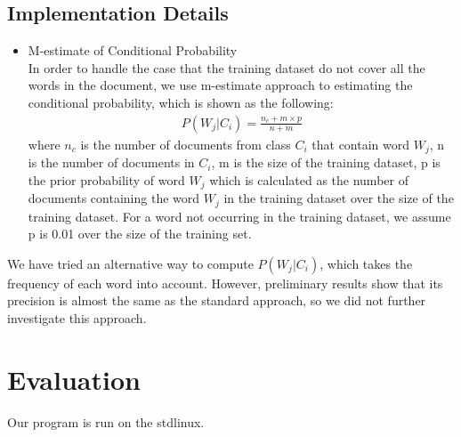 \documentclass{article}
\begin{document}
\subsection{Implementation Details}
\begin{itemize}
\item M-estimate of Conditional Probability\\
In order to handle the case that the training dataset do not cover all the words in the document, we use m-estimate approach to estimating the conditional probability, which is shown as the following:
\begin{align*}
P(W_j|C_i) = \frac{n_c + m \times p}{n + m}
\end{align*}
where $n_c$ is the number of documents from class $C_i$ that contain word $W_j$, n is the number of documents in $C_i$, m is the size of the training dataset, p is the prior probability of word $W_j$ which is calculated as the number of documents containing the word $W_j$ in the training dataset over the size of the training dataset. For a word not occurring in the training dataset, we assume p is 0.01 over the size of the training set.
\end{itemize}

We have tried an alternative way to compute $P(W_j|C_i)$, which takes the frequency of each word into account. However, preliminary results show that its precision is almost the same as the standard approach, so we did not further investigate this approach. 
\section{Evaluation}
Our program is run on the stdlinux.
\end{document}
